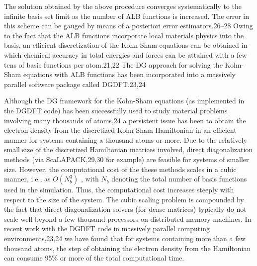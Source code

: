 \documentclass[
  10
]{article}
\begin{document}
The solution obtained by the above procedure converges systematically to
the infinite basis set limit as the number of ALB functions is
increased. The error in this scheme can be gauged by means of a
posteriori error estimators.26--28 Owing to the fact that the ALB
functions incorporate local materials physics into the basis, an
efficient discretization of the Kohn-Sham equations can be obtained in
which chemical accuracy in total energies and forces can be attained
with a few tens of basis functions per atom.21,22 The DG approach for
solving the Kohn-Sham equations with ALB functions has been incorporated
into a massively parallel software package called DGDFT.23,24

Although the DG framework for the Kohn-Sham equations (as implemented in
the DGDFT code) has been successfully used to study material problems
involving many thousands of atoms,24 a persistent issue has been to
obtain the electron density from the discretized Kohn-Sham Hamiltonian
in an efficient manner for systems containing a thousand atoms or more.
Due to the relatively small size of the discretized Hamiltonian matrices
involved, direct diagonalization methods (via ScaLAPACK,29,30 for
example) are feasible for systems of smaller size. However, the
computational cost of the these methods scales in a cubic manner, i.e.,
as \(O ( N _ { b } ^ { 3 } )\) , with \(N _ { b }\) denoting the total
number of basis functions used in the simulation. Thus, the
computational cost increases steeply with respect to the size of the
system. The cubic scaling problem is compounded by the fact that direct
diagonalization solvers (for dense matrices) typically do not scale well
beyond a few thousand processors on distributed memory machines. In
recent work with the DGDFT code in massively parallel computing
environments,23,24 we have found that for systems containing more than a
few thousand atoms, the step of obtaining the electron density from the
Hamiltonian can consume 95\% or more of the total computational time.
\end{document}
